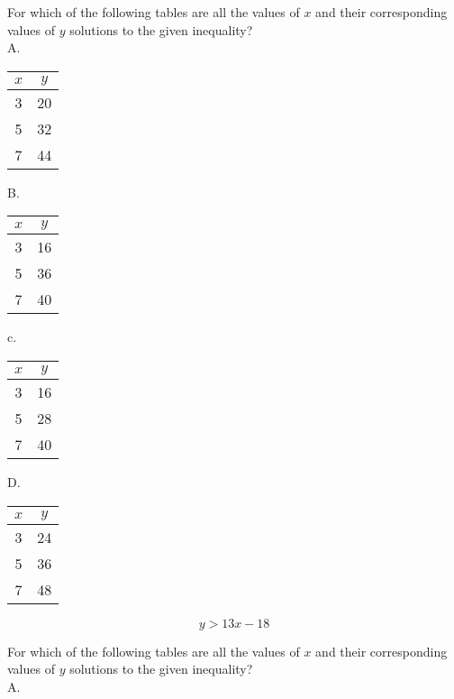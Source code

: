 For which of the following tables are all the values of $x$ and their corresponding values of $y$ solutions to the given inequality?\\
A.

\begin{center}
\begin{tabular}{|c|c|}
\hline
$x$ & $y$ \\
\hline
3 & 20 \\
\hline
5 & 32 \\
\hline
7 & 44 \\
\hline
\end{tabular}
\end{center}

B.

\begin{center}
\begin{tabular}{|c|c|}
\hline
$x$ & $y$ \\
\hline
3 & 16 \\
\hline
5 & 36 \\
\hline
7 & 40 \\
\hline
\end{tabular}
\end{center}

c.

\begin{center}
\begin{tabular}{|c|c|}
\hline
$x$ & $y$ \\
\hline
3 & 16 \\
\hline
5 & 28 \\
\hline
7 & 40 \\
\hline
\end{tabular}
\end{center}

D.

\begin{center}
\begin{tabular}{|c|c|}
\hline
$x$ & $y$ \\
\hline
3 & 24 \\
\hline
5 & 36 \\
\hline
7 & 48 \\
\hline
\end{tabular}
\end{center}

$$
y>13 x-18
$$

For which of the following tables are all the values of $x$ and their corresponding values of $y$ solutions to the given inequality?\\
A.

